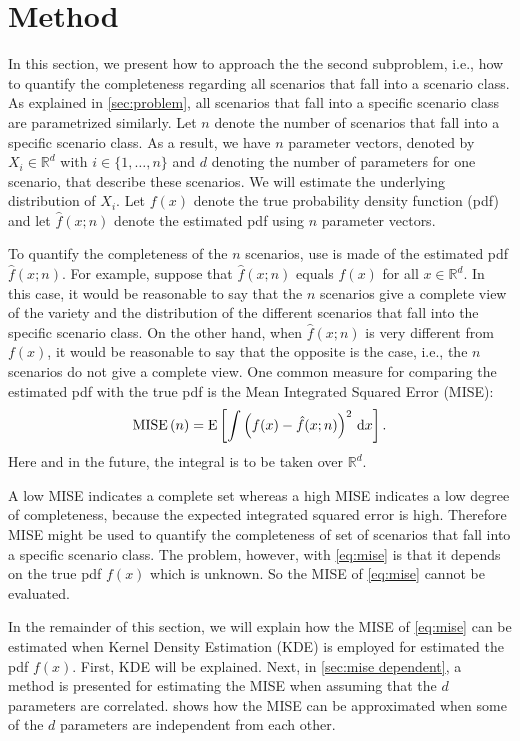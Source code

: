 \section{Method}
\label{sec:method}

In this section, we present how to approach the the second subproblem, i.e., how to quantify the completeness regarding all scenarios that fall into a scenario class. As explained in \cref{sec:problem}, all scenarios that fall into a specific scenario class are parametrized similarly. Let $n$ denote the number of scenarios that fall into a specific scenario class. As a result, we have $n$ parameter vectors, denoted by $X_i \in \mathbb{R}^d$ with $i\in \{1,\ldots,n\}$ and $d$ denoting the number of parameters for one scenario, that describe these scenarios. We will estimate the underlying distribution of $X_i$. Let $f(x)$ denote the true probability density function (pdf) and let $\hat{f}(x;n)$ denote the estimated pdf using $n$ parameter vectors.

To quantify the completeness of the $n$ scenarios, use is made of the estimated pdf $\hat{f}(x;n)$. For example, suppose that $\hat{f}(x;n)$ equals $f(x)$ for all $x \in \mathbb{R}^d$. In this case, it would be reasonable to say that the $n$ scenarios give a complete view of the variety and the distribution of the different scenarios that fall into the specific scenario class. On the other hand, when $\hat{f}(x;n)$ is very different from $f(x)$, it would be reasonable to say that the opposite is the case, i.e., the $n$ scenarios do not give a complete view. One common measure for comparing the estimated pdf with the true pdf is the Mean Integrated Squared Error (MISE):
\begin{equation}
	\label{eq:mise}
	\textup{MISE} \left( n \right) = \textup{E} \left[ \int \left( f(x) - \hat{f}(x;n) \right)^2 \mathrm{\,d} x \right].
\end{equation}
Here and in the future, the integral is to be taken over $\mathbb{R}^d$.

A low MISE indicates a complete set whereas a high MISE indicates a low degree of completeness, because the expected integrated squared error is high. Therefore MISE might be used to quantify the completeness of set of scenarios that fall into a specific scenario class. The problem, however, with \cref{eq:mise} is that it depends on the true pdf $f(x)$ which is unknown. So the MISE of \cref{eq:mise} cannot be evaluated.

In the remainder of this section, we will explain how the MISE of \cref{eq:mise} can be estimated when Kernel Density Estimation (KDE) is employed for estimated the pdf $f(x)$. First, KDE will be explained. Next, in \cref{sec:mise dependent}, a method is presented for estimating the MISE when assuming that the $d$ parameters are correlated.  shows how the MISE can be approximated when some of the $d$ parameters are independent from each other.

